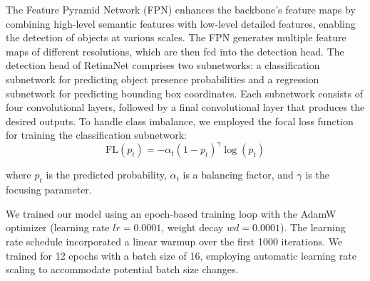 The Feature Pyramid Network (FPN) enhances the backbone's feature maps by combining high-level semantic features with low-level detailed features, enabling the detection of objects at various scales. The FPN generates multiple feature maps of different resolutions, which are then fed into the detection head. The detection head of RetinaNet comprises two subnetworks: a classification subnetwork for predicting object presence probabilities and a regression subnetwork for predicting bounding box coordinates. Each subnetwork consists of four convolutional layers, followed by a final convolutional layer that produces the desired outputs. To handle class imbalance, we employed the focal loss function \cite{lin2017focal} for training the classification subnetwork:
\vspace{-0.2cm}
\begin{equation}
\text{FL}(p_t) = -\alpha_t (1 - p_t)^\gamma \log(p_t)
\end{equation}

where \(p_t\) is the predicted probability, \(\alpha_t\) is a balancing factor, and \(\gamma\) is the focusing parameter.

We trained our model using an epoch-based training loop with the AdamW optimizer (learning rate \(lr = 0.0001\), weight decay \(wd = 0.0001\)). The learning rate schedule incorporated a linear warmup over the first 1000 iterations. We trained for 12 epochs with a batch size of 16, employing automatic learning rate scaling to accommodate potential batch size changes.



